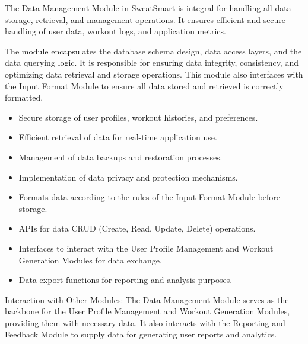 \documentclass[12pt, titlepage]{article}
\begin{document}
The Data Management Module in SweatSmart is integral for handling all data storage, retrieval, and management operations. It ensures efficient and secure handling of user data, workout logs, and application metrics.

\begin{description}[leftmargin=0pt]
\item[Secrets:] 
The module encapsulates the database schema design, data access layers, and the data querying logic. It is responsible for ensuring data integrity, consistency, and optimizing data retrieval and storage operations. This module also interfaces with the Input Format Module to ensure all data stored and retrieved is correctly formatted.
\end{description}

\begin{description}[leftmargin=0pt]
\item[Services:] 
\end{description}
\begin{itemize}[leftmargin=*]
\item Secure storage of user profiles, workout histories, and preferences.
\item Efficient retrieval of data for real-time application use.
\item Management of data backups and restoration processes.
\item Implementation of data privacy and protection mechanisms.
\item Formats data according to the rules of the Input Format Module before storage.
\end{itemize}

\begin{description}[leftmargin=0pt]
\item[Interfaces:] 
\end{description}
\begin{itemize}[leftmargin=*]
\item APIs for data CRUD (Create, Read, Update, Delete) operations.
\item Interfaces to interact with the User Profile Management and Workout Generation Modules for data exchange.
\item Data export functions for reporting and analysis purposes.
\end{itemize}

Interaction with Other Modules: The Data Management Module serves as the backbone for the User Profile Management and Workout Generation Modules, providing them with necessary data. It also interacts with the Reporting and Feedback Module to supply data for generating user reports and analytics.
\\
\end{document}
